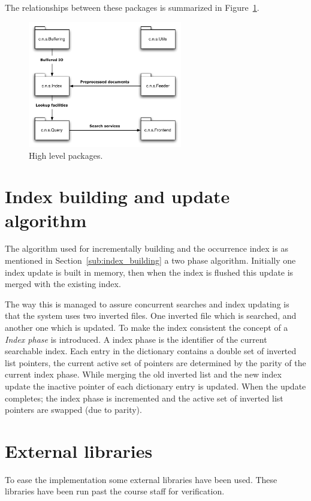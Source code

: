 The relationships between these packages is summarized in Figure~\ref{fig:high_level_packages}. 

\begin{figure}[ht]
	\centering
	\includegraphics[width=0.6\textwidth]{include/packages.pdf}
	\caption{High level packages.}\label{fig:high_level_packages}
\end{figure}

\section{Index building and update algorithm}
The algorithm used for incrementally building and the occurrence index is as mentioned in Section~\ref{sub:index_building} a two phase algorithm. Initially one index update is built in memory, then when the index is flushed this update is merged with the existing index.

The way this is managed to assure concurrent searches and index updating is that the system uses  two inverted files. One inverted file which is searched, and another one which is updated. To make the index consistent the concept of a \emph{Index phase} is introduced. A index phase is the identifier of the current searchable index. Each entry in the dictionary contains a double set of inverted list pointers, the current active set of pointers are determined by the parity of the current index phase. While merging the old inverted list and the new index update the inactive pointer of each dictionary entry is updated. When the update completes; the index phase is incremented and the active set of inverted list pointers are swapped (due to parity).

\section{External libraries}\label{sec:external_libraries}
To ease the implementation some external libraries have been used. These libraries have been run past the course staff for verification.


